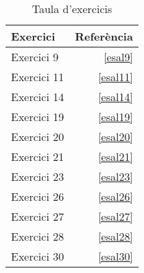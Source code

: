 \documentclass[../main.tex]{subfiles}
\begin{document}
\begin{table}[H]
    \centering
    \begin{tabular}{|l|r|}
        \hline Exercici & Referència \\\hline
        Exercici 9 & \ref{esal9} \\\hline
        Exercici 11 & \ref{esal11} \\\hline
        Exercici 14 & \ref{esal14} \\\hline
        Exercici 19 & \ref{esal19} \\\hline
        Exercici 20 & \ref{esal20} \\\hline
        Exercici 21 & \ref{esal21} \\\hline
        Exercici 23 & \ref{esal23} \\\hline
        Exercici 26 & \ref{esal26} \\\hline
        Exercici 27 & \ref{esal27} \\\hline
        Exercici 28 & \ref{esal28} \\\hline
        Exercici 30 & \ref{esal30} \\\hline
    \end{tabular}
    \caption{Taula d'exercicis}
    \label{tab:taulaexercicis}
\end{table}
\end{document}
